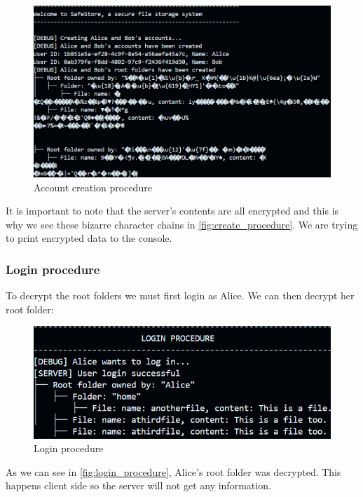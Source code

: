 \begin{figure}[ht]
    \centering
    \includegraphics[width=\textwidth]{screenshots/create_procedure.png}
    \caption{Account creation procedure}
    \label{fig:create_procedure}
\end{figure}

It is important to note that the server's contents are all encrypted and this is why we see these bizarre character chains in \autoref{fig:create_procedure}. We are trying to print encrypted data to the console.


\subsubsection{Login procedure}
To decrypt the root folders we must first login as Alice. We can then decrypt her root folder:

\begin{figure}[H]
    \centering
    \includegraphics[width=\textwidth]{screenshots/login_procedure.png}
    \caption{Login procedure}
    \label{fig:login_procedure}
\end{figure}

As we can see in \autoref{fig:login_procedure}, Alice's root folder was decrypted. This happens client side so the server will not get any information.

